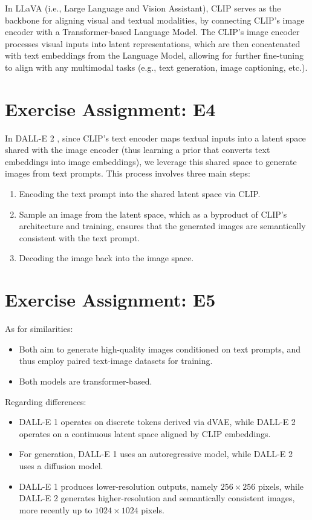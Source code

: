\documentclass{article}
\begin{document}
In LLaVA \cite{llava2023} (i.e., Large Language and Vision Assistant), CLIP \cite{CLIP2021} serves as the backbone for aligning visual and textual modalities, by connecting CLIP's image encoder with a Transformer-based Language Model. The CLIP's image encoder processes visual inputs into latent representations, which are then concatenated with text embeddings from the Language Model, allowing for further fine-tuning to align with any multimodal tasks (e.g., text generation, image captioning, etc.).

\section{Exercise Assignment: E4}\label{sec:e4}

In DALL-E 2 \cite{dalle-2-2022}, since CLIP's text encoder maps textual inputs into a latent space shared with the image encoder (thus learning a prior that converts text embeddings into image embeddings), we leverage this shared space to generate images from text prompts. This process involves three main steps: 
\begin{enumerate}
    \item Encoding the text prompt into the shared latent space via CLIP.
    \item Sample an image from the latent space, which as a byproduct of CLIP's architecture and training, ensures that the generated images are semantically consistent with the text prompt.
    \item Decoding the image back into the image space.
\end{enumerate}

\section{Exercise Assignment: E5}\label{sec:e5}

As for similarities: 
\begin{itemize}
    \item Both aim to generate high-quality images conditioned on text prompts, and thus employ paired text-image datasets for training.
    \item Both models are transformer-based.
\end{itemize}
Regarding differences:
\begin{itemize}
    \item DALL-E 1 operates on discrete tokens derived via dVAE, while DALL-E 2 operates on a continuous latent space aligned by CLIP embeddings.
    \item For generation, DALL-E 1 uses an autoregressive model, while DALL-E 2 uses a diffusion model. 
    \item DALL-E 1 produces lower-resolution outputs, namely \( 256 \times 256 \) pixels, while DALL-E 2 generates higher-resolution and semantically consistent images, more recently up to \( 1024 \times 1024 \) pixels.
\end{itemize}
\end{document}

